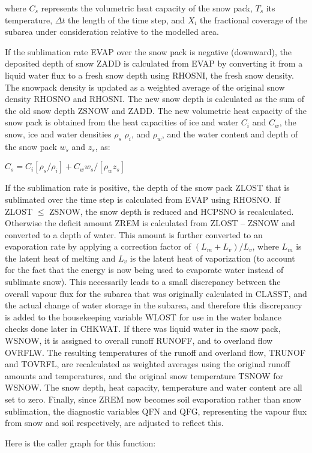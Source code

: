 where $C_s$ represents the volumetric heat capacity of the snow pack, $T_s$ its temperature, $\Delta t$ the length of the time step, and $X_i$ the fractional coverage of the subarea under consideration relative to the modelled area.

If the sublimation rate E\+V\+A\+P over the snow pack is negative (downward), the deposited depth of snow Z\+A\+D\+D is calculated from E\+V\+A\+P by converting it from a liquid water flux to a fresh snow depth using R\+H\+O\+S\+N\+I, the fresh snow density. The snowpack density is updated as a weighted average of the original snow density R\+H\+O\+S\+N\+O and R\+H\+O\+S\+N\+I. The new snow depth is calculated as the sum of the old snow depth Z\+S\+N\+O\+W and Z\+A\+D\+D. The new volumetric heat capacity of the snow pack is obtained from the heat capacities of ice and water $C_i$ and $C_w$, the snow, ice and water densities $\rho_s$ $\rho_i$, and $\rho_w$, and the water content and depth of the snow pack $w_s$ and $z_s$, as\+:

$C_s = C_i [\rho_s / \rho_i ] + C_w w_s /[\rho_w z_s]$

If the sublimation rate is positive, the depth of the snow pack Z\+L\+O\+S\+T that is sublimated over the time step is calculated from E\+V\+A\+P using R\+H\+O\+S\+N\+O. If Z\+L\+O\+S\+T $\leq$ Z\+S\+N\+O\+W, the snow depth is reduced and H\+C\+P\+S\+N\+O is recalculated. Otherwise the deficit amount Z\+R\+E\+M is calculated from Z\+L\+O\+S\+T – Z\+S\+N\+O\+W and converted to a depth of water. This amount is further converted to an evaporation rate by applying a correction factor of $(L_m+ L_v)/L_v$, where $L_m$ is the latent heat of melting and $L_v$ is the latent heat of vaporization (to account for the fact that the energy is now being used to evaporate water instead of sublimate snow). This necessarily leads to a small discrepancy between the overall vapour flux for the subarea that was originally calculated in C\+L\+A\+S\+S\+T, and the actual change of water storage in the subarea, and therefore this discrepancy is added to the housekeeping variable W\+L\+O\+S\+T for use in the water balance checks done later in C\+H\+K\+W\+A\+T. If there was liquid water in the snow pack, W\+S\+N\+O\+W, it is assigned to overall runoff R\+U\+N\+O\+F\+F, and to overland flow O\+V\+R\+F\+L\+W. The resulting temperatures of the runoff and overland flow, T\+R\+U\+N\+O\+F and T\+O\+V\+R\+F\+L, are recalculated as weighted averages using the original runoff amounts and temperatures, and the original snow temperature T\+S\+N\+O\+W for W\+S\+N\+O\+W. The snow depth, heat capacity, temperature and water content are all set to zero. Finally, since Z\+R\+E\+M now becomes soil evaporation rather than snow sublimation, the diagnostic variables Q\+F\+N and Q\+F\+G, representing the vapour flux from snow and soil respectively, are adjusted to reflect this.

Here is the caller graph for this function\+:


